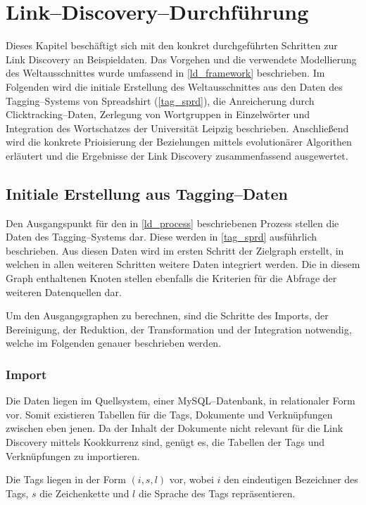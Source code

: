 \chapter{Link--Discovery--Durchführung}
\label{link_discovery}

Dieses Kapitel beschäftigt sich mit den konkret durchgeführten Schritten zur Link Discovery an Beispieldaten. Das Vorgehen und die verwendete Modellierung des Weltausschnittes wurde umfassend in \cref{ld_framework} beschrieben. Im Folgenden wird die initiale Erstellung des Weltausschnittes aus den Daten des Tagging--Systems von Spreadshirt (\cref{tag_sprd}), die Anreicherung durch Clicktracking--Daten, Zerlegung von Wortgruppen in Einzelwörter und Integration des Wortschatzes der Universität Leipzig beschrieben. Anschließend wird die konkrete Prioisierung der Beziehungen mittels evolutionärer Algorithen erläutert und die Ergebnisse der Link Discovery zusammenfassend ausgewertet.

\section{Initiale Erstellung aus Tagging--Daten}
\label{ld_tags}

Den Ausgangspunkt für den in \cref{ld_process} beschriebenen Prozess stellen die Daten des Tagging--Systems dar. Diese werden in \cref{tag_sprd} ausführlich beschrieben. Aus diesen Daten wird im ersten Schritt der Zielgraph erstellt, in welchen in allen weiteren Schritten weitere Daten integriert werden. Die in diesem Graph enthaltenen Knoten stellen ebenfalls die Kriterien für die Abfrage der weiteren Datenquellen dar.

Um den Ausgangsgraphen zu berechnen, sind die Schritte des Imports, der Bereinigung, der Reduktion, der Transformation und der Integration notwendig, welche im Folgenden genauer beschrieben werden.

\subsection{Import}

Die Daten liegen im Quellsystem, einer MySQL--Datenbank, in relationaler Form vor. Somit existieren Tabellen für die Tags, Dokumente und Verknüpfungen zwischen eben jenen. Da der Inhalt der Dokumente nicht relevant für die Link Discovery mittels Kookkurrenz sind, genügt es, die Tabellen der Tags und Verknüpfungen zu importieren.

Die Tags liegen in der Form \((i, s, l)\) vor, wobei \(i\) den eindeutigen Bezeichner des Tags, \(s\) die Zeichenkette und \(l\) die Sprache des Tags repräsentieren.

